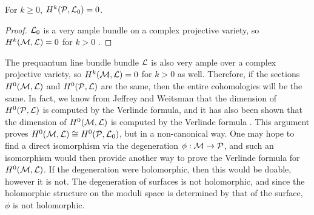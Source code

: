 \begin{corollary}
	For $k\geq 0$, $H^k(\mathcal{P},\mathcal{L}_0) =0$.
\end{corollary}
\begin{proof}
	$\mathcal{L}_0$ is a very ample bundle on a complex projective variety, so $H^k(\mathcal{M},\mathcal{L})=0$ for $k>0$ \cite[III, Prop 2.6.1]{grothendieck_elements_1960}.
\end{proof}
The prequantum line bundle bundle $\mathcal{L}$ is also very ample over a complex projective variety, so $H^k(\mathcal{M},\mathcal{L})=0$ for $k>0$ as well. Therefore, if the sections $H^0(\mathcal{M},\mathcal{L})$ and $H^0(\mathcal{P},\mathcal{L})$ are the same, then the entire cohomologies will be the same. In fact, we know from Jeffrey and Weitsman that the dimension of $H^0(\mathcal{P},\mathcal{L})$ is computed by the Verlinde formula, and it has also been shown that the dimension of $H^0(\mathcal{M},\mathcal{L})$ is computed by the Verlinde formula \cite{faltings_proof_1994}\cite{schottenloher_mathematical_2008}. This argument proves $H^0(\mathcal{M},\mathcal{L})\cong H^0(\mathcal{P},\mathcal{L}_0)$, but in a non-canonical way. One may hope to find a direct isomorphism via the degeneration $\phi:\mathcal{M}\to\mathcal{P}$, and such an isomorphism would then provide another way to prove the Verlinde formula for $H^0(\mathcal{M},\mathcal{L})$. If the degeneration were holomorphic, then this would be doable, however it is not. The degeneration of surfaces is not holomorphic, and since the holomorphic structure on the moduli space is determined by that of the surface, $\phi$ is not holomorphic.

	